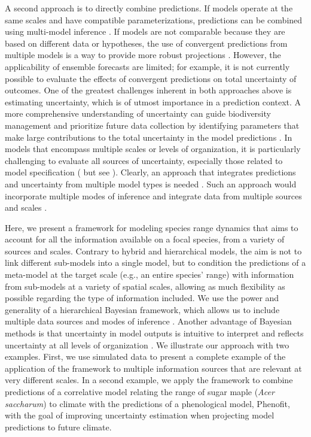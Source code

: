 A second approach is to directly combine predictions.
If models operate at the same scales and have compatible parameterizations, predictions can be combined using multi-model inference \citep[e.g., model averaging, ensemble forecasting;][]{Thuiller2004, Araujo2007}. 
If models are not comparable because they are based on different data or hypotheses, the use of convergent predictions from multiple models is a way to provide more robust projections \citep{Morin2009, Marmion2009, Serra-Diaz2013}.
However, the applicability of ensemble forecasts are limited; for example, it is not currently possible to evaluate the effects of convergent predictions on total uncertainty of outcomes.
One of the greatest challenges inherent in both approaches above is estimating uncertainty, which is of utmost importance in a prediction context.
A more comprehensive understanding of uncertainty can guide biodiversity management and prioritize future data collection by identifying parameters that make large contributions to the total uncertainty in the model predictions \citep{McMahon2011}. 
In models that encompass multiple scales or levels of organization, it is particularly challenging to evaluate all sources of uncertainty, especially those related to model specification (\citealt{Calder2003} but see \citealt{Conlisk2013}).
Clearly, an approach that integrates predictions and uncertainty from multiple model types is needed \citep{Beck2012, Thuiller2013}. 
Such an approach would incorporate multiple modes of inference and integrate data from multiple sources and scales \citep{Levin1992, Peters2004, Thuiller2013}.

Here, we present a framework for modeling species range dynamics that aims to account for all the information available on a focal species, from a variety of sources and scales.
Contrary to hybrid and hierarchical models, the aim is not to link different sub-models into a single model, but to condition the predictions of a meta-model at the target scale (e.g., an entire species' range) with information from sub-models at a variety of spatial scales, allowing as much flexibility as possible regarding the type of information included. 
We use the power and generality of a hierarchical Bayesian framework, which allows us to include multiple data sources and modes of inference \citep{Clark2005, VanOijen2005, Clark2006, Hobbs2011, Hartig2012}. 
Another advantage of Bayesian methods is that uncertainty in model outputs is intuitive to interpret and reflects uncertainty at all levels of organization \citep{Clark2005, Cressie2009, Hobbs2011}. 
We illustrate our approach with two examples.
First, we use simulated data to present a complete example of the application of the framework to multiple information sources that are relevant at very different scales.
In a second example, we apply the framework to combine predictions of a correlative model relating the range of sugar maple (\emph{Acer saccharum}) to climate with the predictions of a phenological model, Phenofit, with the goal of improving uncertainty estimation when projecting model predictions to future climate.
